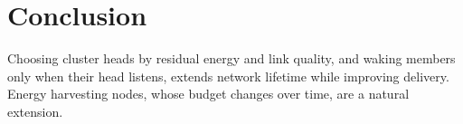 \chapter{Conclusion}
\label{ch:conclusion}

Choosing cluster heads by residual energy and link quality, and waking members only when their
head listens, extends network lifetime while improving delivery. Energy harvesting nodes, whose
budget changes over time, are a natural extension.
